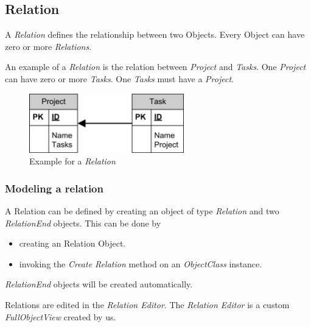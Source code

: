 \subsection{Relation}

A \emph{Relation} defines the relationship between two Objects. Every Object can have zero or more \emph{Relations}.

An example of a \emph{Relation} is the relation between \emph{Project} and \emph{Tasks}. One \emph{Project} can have zero or more \emph{Tasks}. One \emph{Tasks} must have a \emph{Project}.

\begin{figure}[ht]
	\begin{center}
		\includegraphics[width=0.6\textwidth]{images/Rel_1_n_Project_Tasks.png}
		\caption{Example for a \emph{Relation}}
		\label{example_for_relation}
	\end{center}
\end{figure}


\subsubsection{Modeling a relation}
A Relation can be defined by creating an object of type \emph{Relation} and two \emph{RelationEnd} objects. This can be done by
\begin{itemize}
	\item creating an Relation Object. 
	\item invoking the \emph{Create Relation} method on an \emph{ObjectClass} instance.
\end{itemize}

\emph{RelationEnd} objects will be created automatically.

\par
Relations are edited in the \emph{Relation Editor}. The \emph{Relation Editor} is a custom \emph{FullObjectView} created by us.

